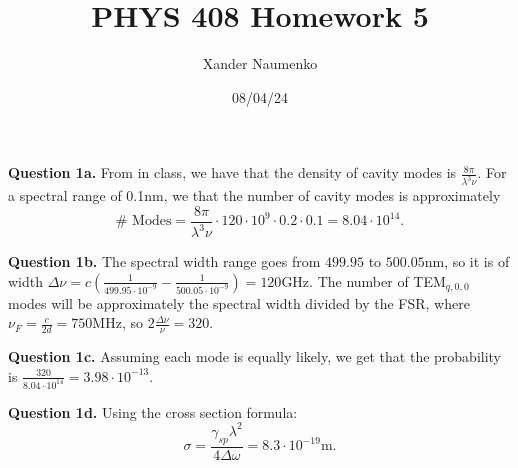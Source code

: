 \documentclass[letterpaper, reqno,11pt]{article}
\begin{document}
\title{PHYS 408 Homework 5}
\date{08/04/24}
\author{Xander Naumenko}
\maketitle


{\medskip\noindent\bf Question 1a.} From in class, we have that the density of cavity modes is $\frac{8\pi}{\lambda^3\nu}$. For a spectral range of 0.1nm, we that the number of cavity modes is approximately
\[
\#\text{ Modes}=\frac{8\pi}{\lambda^3\nu}\cdot 120\cdot 10^{9}\cdot 0.2\cdot 0.1=8.04\cdot 10^{14}
.\]

{\medskip\noindent\bf Question 1b.} The spectral width range goes from $499.95$ to $500.05$nm, so it is of width $\Delta\nu=c \left( \frac{1}{499.95\cdot 10^{-9}}-\frac{1}{500.05\cdot 10^{-9}} \right)=120$GHz. The number of TEM$_{q,0,0}$ modes will be approximately the spectral width divided by the FSR, where $\nu_F=\frac{c}{2d}=750$MHz, so $2\frac{\Delta\nu}{\nu}=320$.

{\medskip\noindent\bf Question 1c.} Assuming each mode is equally likely, we get that the probability is $\frac{320}{8.04\cdot 10^{14}}=3.98\cdot 10^{-13}$.

{\medskip\noindent\bf Question 1d.} Using the cross section formula:
\[
\sigma= \frac{\gamma_{sp}\lambda^2}{4\Delta\omega}=8.3\cdot 10^{-19}\text{m}
.\]

\end{document}

